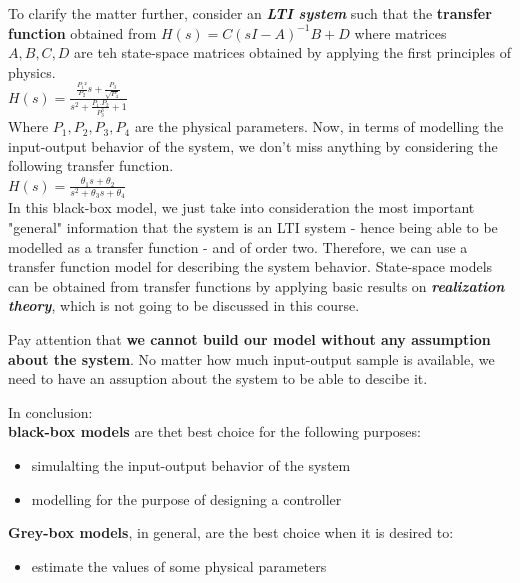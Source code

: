 To clarify the matter further, consider an \textbf{\textit{LTI system}} such that the \textbf{transfer function} obtained from \(H(s) = C (sI - A)^{-1}B +D\) where matrices \(A, B, C, D\) are teh state-space matrices obtained by applying the first principles of physics.\\

\(
H(s) = \frac{ \frac{P_1²}{P_2} s + \frac{P_3}{\sqrt{P_4}}}{s^2 + \frac{P_1.P_2}{P_3^3} + 1}
\)\\

Where \(P_1, P_2, P_3, P_4\) are the physical parameters. Now, in terms of modelling the input-output behavior of the system, we don't miss anything by considering the following transfer function.\\

\(
H(s) = \frac{\theta_1 s + \theta_2}{s^2 + \theta_3 s + \theta_4}
\)\\

In this black-box model, we just take into consideration the most important "general" information that the system is an LTI system - hence being able to be modelled as a transfer function - and of order two. Therefore, we can use a transfer function model for describing the system behavior. State-space models can be obtained from transfer functions by applying basic results on \textbf{\textit{realization theory}}, which is not going to be discussed in this course.\\

\begin{factbox}
    Pay attention that \textbf{we cannot build our model without any assumption about the system}. No matter how much input-output sample is available,  we need to have an assuption about the system to be able to descibe it.
\end{factbox}

In conclusion: \\
\textbf{black-box models} are thet best choice for the following purposes:
\begin{itemize}
    \item simulalting the input-output behavior of the system
    \item modelling for the purpose of designing a controller\\
\end{itemize}

\textbf{Grey-box models}, in general, are the best choice when it is desired to:
\begin{itemize}
    \item estimate the values of some physical parameters \\
\end{itemize}

